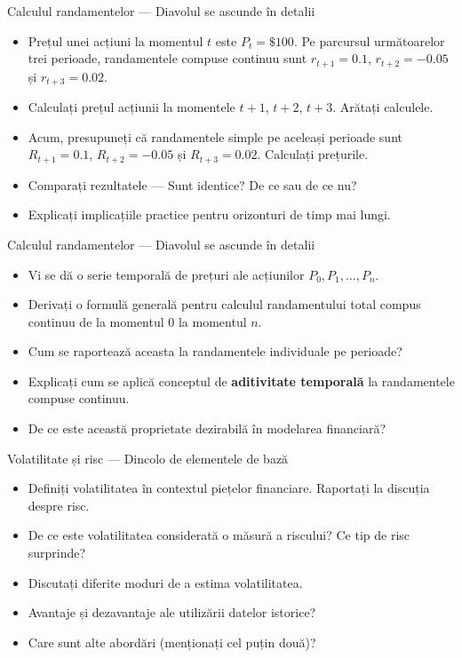 \documentclass[9pt, aspectratio=169, t]{beamer}
\theoremstyle{definition}
\begin{document}
\begin{frame}{Calculul randamentelor --- Diavolul se ascunde în detalii}
\begin{itemize}
    \item Prețul unei acțiuni la momentul $t$ este $P_t = \$100$. Pe parcursul următoarelor trei perioade, randamentele compuse continuu sunt $r_{t+1} = 0.1$, $r_{t+2} = -0.05$ și $r_{t+3} = 0.02$.
    \item Calculați prețul acțiunii la momentele $t+1$, $t+2$, $t+3$. Arătați calculele.
    \item Acum, presupuneți că randamentele simple pe aceleași perioade sunt $R_{t+1} = 0.1$, $R_{t+2} = -0.05$ și $R_{t+3} = 0.02$. Calculați prețurile.
    \item Comparați rezultatele --- Sunt identice? De ce sau de ce nu?
    \item Explicați implicațiile practice pentru orizonturi de timp mai lungi.
\end{itemize}
\end{frame}

\begin{frame}{Calculul randamentelor --- Diavolul se ascunde în detalii}
\begin{itemize}
    \item Vi se dă o serie temporală de prețuri ale acțiunilor $P_0, P_1, \ldots, P_n$.
    \item Derivați o formulă generală pentru calculul randamentului total compus continuu de la momentul $0$ la momentul $n$.
    \item Cum se raportează aceasta la randamentele individuale pe perioade?
    \item Explicați cum se aplică conceptul de \textbf{aditivitate temporală} la randamentele compuse continuu.
    \item De ce este această proprietate dezirabilă în modelarea financiară?
\end{itemize}
\end{frame}

\begin{frame}{Volatilitate și risc --- Dincolo de elementele de bază}
\begin{itemize}
    \item Definiți volatilitatea în contextul piețelor financiare. Raportați la discuția despre risc.
    \item De ce este volatilitatea considerată o măsură a riscului? Ce tip de risc surprinde?
    \item Discutați diferite moduri de a estima volatilitatea.
    \item Avantaje și dezavantaje ale utilizării datelor istorice?
    \item Care sunt alte abordări (menționați cel puțin două)?
\end{itemize}
\end{frame}
\end{document}
